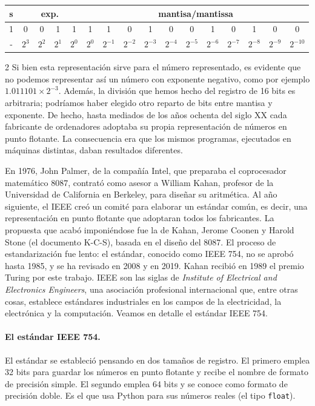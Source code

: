 \begin{table}[h]
	\centering
\begin{tabular}{|c||c|c|c|c||c|c|c|c|c|c|c|c|c|c|c|}
\hline
s&\multicolumn{4}{c||}{exp.}&\multicolumn{11}{c|}{mantisa/mantissa}\\
\hline
1&0&0&1&1&1&1&0&1&0&0&1&0&1&0&0\\
\hline
-&$2^{3}$&$2^{2}$&$2^{1}$&$2^{0}$&$2^{0}$&$2^{-1}$&$2^{-2}$&$2^{-3}$&$2^{-4}$&$2^{-5}$&$2^{-6}$&$2^{-7}$&$2^{-8}$&$2^{-9}$&$2^{-10}$\\
\hline
\end{tabular}
\end{table}
\begin{paracol}{2}
Si bien esta representación sirve para el número representado, es evidente que no podemos representar así un número con exponente negativo, como por ejemplo $1.011101\times 2^{-3}$. Además, la división que hemos hecho del registro de 16 bits es arbitraria; podríamos haber elegido otro reparto de bits entre mantisa y exponente. De hecho, hasta mediados de los años ochenta del siglo XX cada fabricante de ordenadores adoptaba su propia representación de números en punto flotante. La consecuencia era que los mismos programas, ejecutados en máquinas distintas, daban resultados diferentes.

En 1976, John Palmer, de la compañía Intel, que preparaba el coprocesador matemático 8087, contrató como asesor a William Kahan, profesor de la Universidad de California en Berkeley, para diseñar su aritmética. Al año siguiente, el IEEE creó un comité para elaborar un estándar común, es decir, una representación en punto flotante que adoptaran todos los fabricantes. La propuesta que acabó imponiéndose fue la de Kahan, Jerome Coonen y Harold Stone (el documento K-C-S), basada en el diseño del 8087. El proceso de estandarización fue lento: el estándar, conocido como IEEE 754, no se aprobó hasta 1985, y se ha revisado en 2008 y en 2019. Kahan recibió en 1989 el premio Turing por este trabajo. IEEE son las siglas de \emph{Institute of Electrical and Electronics Engineers}, una asociación profesional internacional que, entre otras cosas, establece estándares industriales en los campos de la electricidad, la electrónica y la computación. Veamos en detalle el estándar IEEE 754.

\paragraph*{El estándar IEEE 754.}
El estándar se estableció pensando en dos tamaños de registro. El primero emplea 32 bits para guardar los números en punto flotante y recibe el nombre de formato de precisión simple. El segundo emplea 64 bits y se conoce como formato de precisión doble. Es el que usa Python para sus números reales (el tipo \texttt{float}).


\end{paracol}

